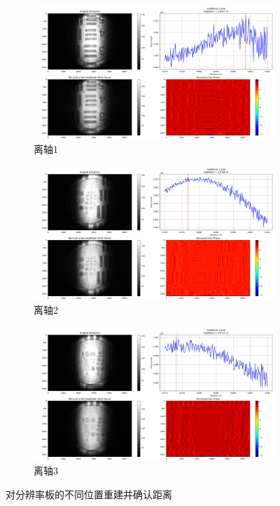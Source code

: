 \documentclass[a4paper,draft]{report}
\begin{document}
\begin{figure}[H]
\centering
\begin{subfigure}{0.9\textwidth}
    \centering
    \includegraphics[width=\linewidth]{lizhou1分辨率板}
    \caption{离轴1}
    \label{Fig.sub.4}
\end{subfigure}

\begin{subfigure}{0.9\textwidth}
    \centering
    \includegraphics[width=\linewidth]{lizhou2分辨率板}
    \caption{离轴2}
    \label{Fig.sub.5}
\end{subfigure}

\begin{subfigure}{0.9\textwidth}
    \centering
    \includegraphics[width=\linewidth]{lizhou3分辨率板}
    \caption{离轴3}
    \label{Fig.sub.6}    
\end{subfigure}

\caption{对分辨率板的不同位置重建并确认距离}
\label{Fig.main2}
\end{figure}
\end{document}
